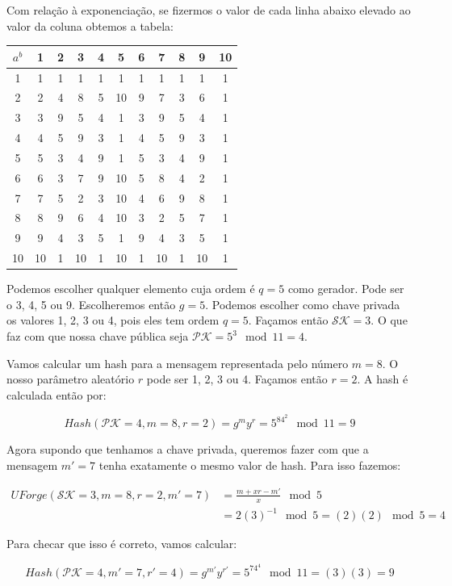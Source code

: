 \documentclass[a4paper]{article}
\begin{document}
Com relação à exponenciação, se fizermos o valor de cada linha abaixo
elevado ao valor da coluna obtemos a tabela:

\begin{tabular}{|c||c|c|c|c|c|c|c|c|c|c|}
  \hline
  $a^b$&1&2&3&4&5&6&7&8&9&10\\
  \hline
  \hline
1&1&1&1&1&1&1&1&1&1&1\\
\hline
2&2&4&8&5&10&9&7&3&6&1\\
\hline
3&3&9&5&4&1&3&9&5&4&1\\
\hline
4&4&5&9&3&1&4&5&9&3&1\\
\hline
5&5&3&4&9&1&5&3&4&9&1\\
\hline
6&6&3&7&9&10&5&8&4&2&1\\
\hline
7&7&5&2&3&10&4&6&9&8&1\\
\hline
8&8&9&6&4&10&3&2&5&7&1\\
\hline
9&9&4&3&5&1&9&4&3&5&1\\
\hline
10&10&1&10&1&10&1&10&1&10&1\\
\hline
\end{tabular}

Podemos escolher qualquer elemento cuja ordem é $q=5$ como
gerador. Pode ser o 3, 4, 5 ou 9. Escolheremos então $g=5$. Podemos
escolher como chave privada os valores 1, 2, 3 ou 4, pois eles tem
ordem $q=5$. Façamos então $\mathcal{SK}=3$. O que faz com que nossa
chave pública seja $\mathcal{PK}=5^3\mod 11 = 4$.

Vamos calcular um hash para a mensagem representada pelo número
$m=8$. O nosso parâmetro aleatório $r$ pode ser 1, 2, 3 ou 4. Façamos
então $r=2$. A hash é calculada então por:

$$
Hash(\mathcal{PK}=4, m=8, r=2) = g^my^r = 5^84^2 \mod 11 = 9
$$

Agora supondo que tenhamos a chave privada, queremos fazer com que a
mensagem $m'=7$ tenha exatamente o mesmo valor de hash. Para isso
fazemos:

\begin{equation}
\begin{split}
  UForge(\mathcal{SK}=3, m=8, r=2, m'=7) &= \frac{m+xr-m'}{x} \mod 5\\
  &= 2(3)^{-1} \mod 5 = (2)(2) \mod 5 = 4
\end{split}
\end{equation}

Para checar que isso é correto, vamos calcular:

$$ Hash(\mathcal{PK}=4, m'=7, r'=4) = g^{m'}y^{r'} = 5^74^4 \mod 11 =
(3)(3)= 9
$$
\end{document}
